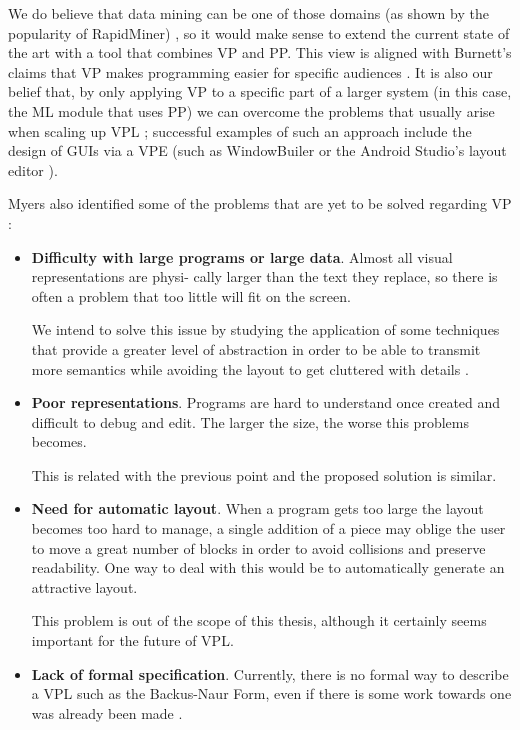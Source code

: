 \begin{itemsize}
We do believe that
data mining can be one of those domains (as shown by the popularity of RapidMiner) \cite{kdn},
so it would make sense to extend the current state of the art with a tool that
combines VP and PP. This view is aligned with Burnett's claims that VP makes
programming easier for specific audiences \cite{Burnett1999}. It is also our belief
that, by only applying VP to a specific part of a larger system (in this case,
the ML module that uses PP) we can overcome the problems that usually arise when
scaling up VPL \cite{Burnett1995}; successful examples of such an approach
include the design of GUIs via a VPE (such as WindowBuiler \cite{winbuild} or
the Android Studio's layout editor \cite{layouted}).

Myers also identified some of the problems that are yet to be solved
regarding VP \cite{Myers1990}:

\begin{itemize}
  \item \textbf{Difficulty with large programs or large data}. Almost all visual representations are physi-
cally larger than the text they replace, so there is often a problem that too little will fit on
the screen.

We intend to solve this issue by studying the application of some techniques
that provide a greater level of abstraction in order to be able to transmit
more semantics while avoiding the layout to get cluttered with details \cite{Burnett1995}.
  \item \textbf{Poor representations}. Programs are hard to understand once created and
difficult to debug and edit. The larger the size, the worse this problems becomes.

This is related with the previous point and the proposed solution is similar.
  \item \textbf{Need for automatic layout}. When a program gets too large the layout
becomes too hard to manage, a single addition of a piece may oblige the user
to move a great number of blocks in order to avoid collisions and preserve
readability. One way to deal with this would be to automatically generate an
attractive layout.

This problem is out of the scope of this thesis, although
it certainly seems important for the future of VPL.
  \item \textbf{Lack of formal specification}. Currently, there is no formal way to describe
a VPL such as the Backus-Naur Form, even if there is some work towards one was
already been made \cite{selker1988elements}.


\end{itemize}
\end{itemsize}
